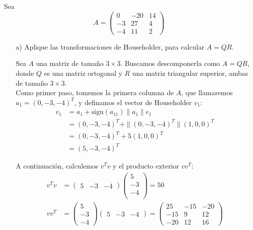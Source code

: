\begin{homeworkProblem}
  Sea
    \begin{equation}
       A=\begin{pmatrix}
          0 & -20 & 14\\
          -3 & 27 & 4\\
          -4 & 11 & 2
       \end{pmatrix}
    \end{equation}
    \begin{itemize}
        \item[a)] Aplique las transformaciones de Householder, para calcular $A=QR$.
        \begin{solucion}
          Sea $A$ una matriz de tamaño $3\times 3$. Buscamos descomponerla como $A=QR$, donde $Q$ es una matriz ortogonal y $R$ una matriz triangular superior, ambas de tamaño $3\times3$.\\
    
    Como primer paso, tomemos la primera columna de $A$, que llamaremos $a_1=(0, -3, -4)^{T}$, y definamos el vector de Householder $v_1$:
    \begin{align*}
        v_1 &= a_1 + \text{sign}(a_{11}) \|a_1\| e_1\\
        &= (0, -3, -4)^{T} + \|(0, -3, -4)^{T}\| (1,0, 0)^{T} \\
        &= (0, -3, -4)^{T} + 5 (1,0, 0)^{T}\\
        &= (5,-3,-4)^{T}
    \end{align*}

    A continuación, calculemos $v^{T}v$ y el producto exterior $v v^{T}$:
    \begin{align*}
        v^{T}v &= \begin{pmatrix} 5 & -3 & -4 \end{pmatrix}
        \begin{pmatrix} 5\\ -3\\ -4\\ \end{pmatrix} = 50\\
        v v^{T} &= \begin{pmatrix} 5\\ -3\\ -4 \end{pmatrix}
        \begin{pmatrix} 5 & -3 & -4 \end{pmatrix} =
        \begin{pmatrix}
            25 & -15 & -20\\
            -15 & 9 & 12\\
            -20 & 12 & 16
        \end{pmatrix}
    \end{align*}


\end{solucion}
\end{itemize}
\end{homeworkProblem}
